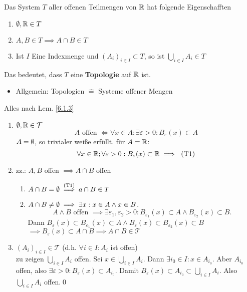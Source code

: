 \begin{subtheorem}
	Das System $ T $ aller offenen Teilmengen von $  \mathbb{R} $ hat folgende Eigenschafften
	\begin{enumerate}[label=T\arabic*)]
		\item $ \emptyset, \mathbb{R} \in T $
		\item $ A, B \in T \implies A \cap B \in T $
		\item Ist $ I $ Eine Indexmenge und $ (A_{i})_{i \in I} \subset T $, so ist $ \bigcup_{i \in  I} A_{i} \in T $
	\end{enumerate}
	Das bedeutet, dass $ T $ eine \textbf{Topologie} auf $ \mathbb{R} $ ist.
	\begin{itemize}
		\item Allgemein: Topologien $ \hat{=} $ Systeme offener Mengen
	\end{itemize}
\end{subtheorem}

\begin{subproof*}
	Alles nach Lem. \ref{6.1.3}
	\begin{enumerate}[label=(T\arabic*)]
		\item $ \emptyset , \mathbb{R} \in  \mathcal{T}  $
			\[
			A \text{ offen } \iff \forall x \in A: \exists \varepsilon > 0 : B_{\varepsilon}(x) \subset A
			\]
			$ A = \emptyset $, so trivialer weiße erfüllt. für $ A = \mathbb{R} $:
			\[
			\forall x \in  \mathbb{R} ; \forall  \varepsilon > 0: B_{\varepsilon}(x) \subset \mathbb{R} \implies \text{ (T1)}
			\]
		\item zz.: $ A, B $ offen $ \implies A \cap B $ offen
			\begin{enumerate}[label=(\roman*)]
				\item $ A \cap B = \emptyset \overset{\text{(T1)}}{\implies} a \cap  B \in T $
				\item $ A \cap B \neq \emptyset\implies\exists x: x \in  A \wedge x \in B $.
					\[
						A \wedge B \text{ offen } \implies \exists \varepsilon_1, \varepsilon_2 > 0: B_{\varepsilon_1}(x) \subset A \wedge B_{\varepsilon_2}(x) \subset B.
					\]
					Dann $ B_{\varepsilon}(x) \subset B_{\varepsilon_1}(x) \subset A \wedge B_{\varepsilon}(x) \subset B_{\varepsilon_2}(x) \subset B $\\
					$ \implies B_{\varepsilon}(x) \subset A \cap B \implies A \cap B \in  \mathcal{T} $
			\end{enumerate}
		\item $ (A_{i} )_{i \in I} \in \mathcal{T}  $ (d.h. $ \forall i \in  I : A_i $ ist offen)\\
			zu zeigen $ \bigcup_{i \in  I} A_i $ offen. Sei $  x \in  \bigcup_{i \in  I} A_i $. Dann $ \exists i_0 \in  I : x \in  A_{i_0}  $. Aber $  A_{i_0}  $ offen, also $  \exists \varepsilon > 0: B_{\varepsilon}(x) \subset A_{i_0}  $. Damit $ B_{\varepsilon}(x) \subset A_{i_0} \subset \bigcup_{i \in  I} A_{i}  $. Also $ \bigcup_{i \in  I} A_{i}  $ offen.\qed
	\end{enumerate}
\end{subproof*}

